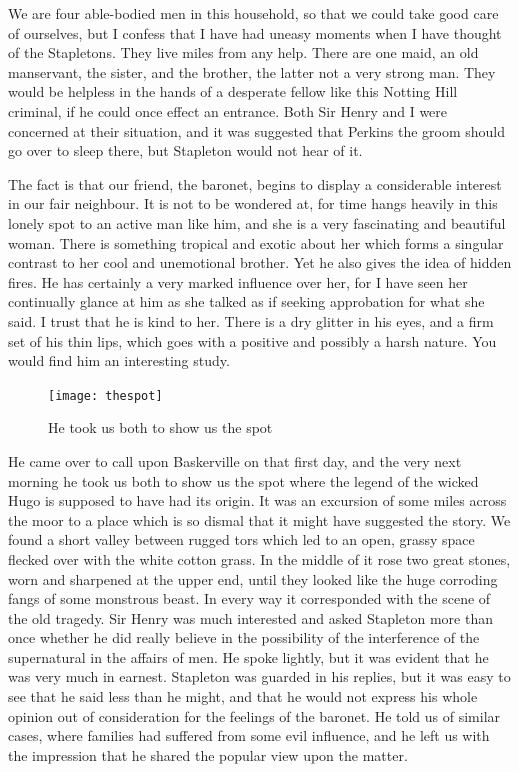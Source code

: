 \documentclass[paper=5.5in:8.5in,BCOR=7mm,twoside,DIV=calc,12pt,usegeometry,openany,chapterprefix,endperiod]{scrbook} %
\begin{document}
We are four able-bodied men in this household, so that we could take good care of ourselves, but I confess that I have had uneasy moments when I have thought of the Stapletons. They live miles from any help. There are one maid, an old manservant, the sister, and the brother, the latter not a very strong man. They would be helpless in the hands of a desperate fellow like this Notting Hill criminal, if he could once effect an entrance. Both Sir Henry and I were concerned at their situation, and it was suggested that Perkins the groom should go over to sleep there, but Stapleton would not hear of it.

The fact is that our friend, the baronet, begins to display a considerable interest in our fair neighbour. It is not to be wondered at, for time hangs heavily in this lonely spot to an active man like him, and she is a very fascinating and beautiful woman. There is something tropical and exotic about her which forms a singular contrast to her cool and unemotional brother. Yet he also gives the idea of hidden fires. He has certainly a very marked influence over her, for I have seen her continually glance at him as she talked as if seeking approbation for what she said. I trust that he is kind to her. There is a dry glitter in his eyes, and a firm set of his thin lips, which goes with a positive and possibly a harsh nature. You would find him an interesting study.

\begin{figure}[tbph]
\centering
\texttt{[image: thespot]}
\caption{He took us both to show us the spot}
\end{figure}

He came over to call upon Baskerville on that first day, and the very next morning he took us both to show us the spot where the legend of the wicked Hugo is supposed to have had its origin. It was an excursion of some miles across the moor to a place which is so dismal that it might have suggested the story. We found a short valley between rugged tors which led to an open, grassy space flecked over with the white cotton grass. In the middle of it rose two great stones, worn and sharpened at the upper end, until they looked like the huge corroding fangs of some monstrous beast. In every way it corresponded with the scene of the old tragedy. Sir Henry was much interested and asked Stapleton more than once whether he did really believe in the possibility of the interference of the supernatural in the affairs of men. He spoke lightly, but it was evident that he was very much in earnest. Stapleton was guarded in his replies, but it was easy to see that he said less than he might, and that he would not express his whole opinion out of consideration for the feelings of the baronet. He told us of similar cases, where families had suffered from some evil influence, and he left us with the impression that he shared the popular view upon the matter.
\end{document}
